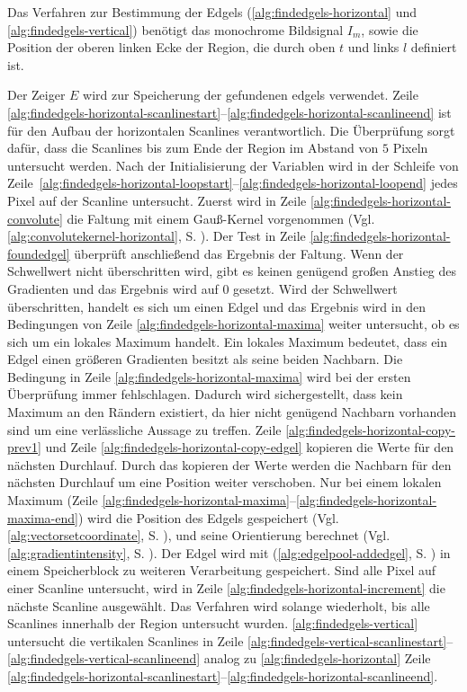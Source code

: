 Das Verfahren zur Bestimmung der Edgels (\autoref{alg:findedgels-horizontal} und \autoref{alg:findedgels-vertical})
 benötigt das monochrome Bildsignal $I_m$, sowie die Position der oberen linken Ecke der Region, die durch oben $t$ und
 links $l$ definiert ist.

Der Zeiger $E$ wird zur Speicherung der gefundenen \glspl{edgel} verwendet. Zeile
 \ref{alg:findedgels-horizontal-scanlinestart}--\ref{alg:findedgels-horizontal-scanlineend} ist für den Aufbau der
 horizontalen Scanlines verantwortlich. Die Überprüfung sorgt dafür, dass die Scanlines bis zum Ende der Region im
 Abstand von $5$ Pixeln untersucht werden. Nach der Initialisierung der Variablen wird in der Schleife von
 Zeile~\ref{alg:findedgels-horizontal-loopstart}--\ref{alg:findedgels-horizontal-loopend} jedes Pixel auf der Scanline
 untersucht. Zuerst wird in Zeile \ref{alg:findedgels-horizontal-convolute} die Faltung mit einem Gauß-Kernel
 vorgenommen (Vgl. \autoref{alg:convolutekernel-horizontal}, S. \pageref{alg:convolutekernel-horizontal}). Der Test
 in Zeile \ref{alg:findedgels-horizontal-foundedgel} überprüft anschließend das Ergebnis der Faltung. Wenn der
 Schwellwert nicht überschritten wird, gibt es keinen genügend großen Anstieg des Gradienten und das Ergebnis wird auf
 $0$ gesetzt. Wird der Schwellwert überschritten, handelt es sich um einen Edgel und das Ergebnis wird in den
 Bedingungen von Zeile \ref{alg:findedgels-horizontal-maxima} weiter untersucht, ob es sich um ein lokales Maximum
 handelt. Ein lokales Maximum bedeutet, dass ein Edgel einen größeren Gradienten besitzt als seine beiden Nachbarn. Die
 Bedingung in Zeile \ref{alg:findedgels-horizontal-maxima} wird bei der ersten Überprüfung immer fehlschlagen.
 Dadurch wird sichergestellt, dass kein Maximum an den Rändern existiert, da hier nicht genügend Nachbarn vorhanden sind
 um eine verlässliche Aussage zu treffen. Zeile \ref{alg:findedgels-horizontal-copy-prev1} und
 Zeile \ref{alg:findedgels-horizontal-copy-edgel} kopieren die Werte für den nächsten Durchlauf. Durch das kopieren der
 Werte werden die Nachbarn für den nächsten Durchlauf um eine Position weiter verschoben. Nur bei einem lokalen Maximum
 (Zeile \ref{alg:findedgels-horizontal-maxima}--\ref{alg:findedgels-horizontal-maxima-end}) wird die Position des
 Edgels gespeichert (Vgl. \autoref{alg:vectorsetcoordinate}, S. \pageref{alg:vectorsetcoordinate}), und seine
 Orientierung berechnet (Vgl. \autoref{alg:gradientintensity}, S. \pageref{alg:gradientintensity}). Der Edgel wird mit
  (\autoref{alg:edgelpool-addedgel}, S. \pageref{alg:edgelpool-addedgel}) in einem Speicherblock zu
 weiteren Verarbeitung gespeichert. Sind alle Pixel auf einer Scanline untersucht, wird in Zeile
 \ref{alg:findedgels-horizontal-increment} die nächste Scanline ausgewählt. Das Verfahren wird solange wiederholt, bis
 alle Scanlines innerhalb der Region untersucht wurden. \autoref{alg:findedgels-vertical} untersucht die vertikalen
 Scanlines in Zeile \ref{alg:findedgels-vertical-scanlinestart}--\ref{alg:findedgels-vertical-scanlineend} analog zu
 \autoref{alg:findedgels-horizontal} Zeile
 \ref{alg:findedgels-horizontal-scanlinestart}--\ref{alg:findedgels-horizontal-scanlineend}.


